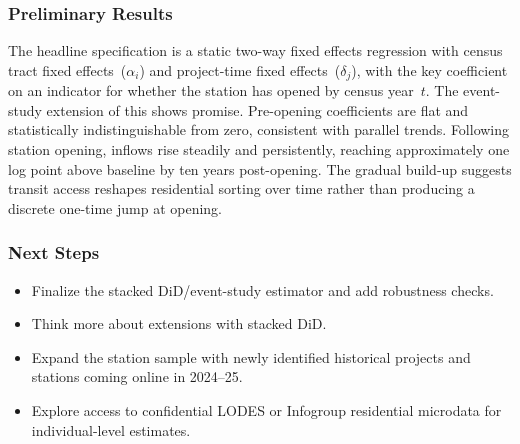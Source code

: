 \documentclass[12pt]{article}
\begin{document}
\subsubsection*{Preliminary Results}
The headline specification is a static two-way fixed effects regression with census tract fixed effects~($\alpha_i$) and project-time fixed effects~($\delta_j$), with the key coefficient on an indicator for whether the station has opened by census year~$t$. The event-study extension of this shows promise. Pre-opening coefficients are flat and statistically indistinguishable from zero, consistent with parallel trends. Following station opening, inflows rise steadily and persistently, reaching approximately one log point above baseline by ten years post-opening. The gradual build-up suggests transit access reshapes residential sorting over time rather than producing a discrete one-time jump at opening.


\subsubsection*{Next Steps}

\begin{itemize}
  \item Finalize the stacked DiD/event-study estimator and add robustness checks.
  \item Think more about \textcite{borusyakNonrandomExposureExogenous2023} extensions with stacked DiD.
  \item Expand the station sample with newly identified historical projects and stations coming online in 2024--25.
  \item Explore access to confidential LODES or Infogroup residential microdata for individual-level estimates.
\end{itemize}

\newpage
\printbibliography
\end{document}
